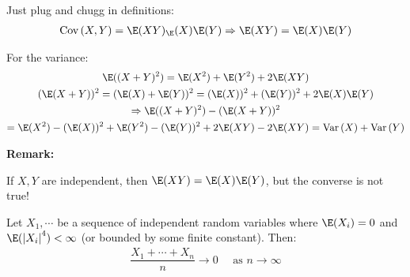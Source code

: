 \begin{prf}[]{}
  Just plug and chugg in definitions:
  \begin{equation*}
    \begin{gathered}
      \text{Cov}\left(X,Y\right) = \E(XY)_\E(X)\E(Y) \Rightarrow \E(XY) = \E(X)\E(Y)
    \end{gathered}
  \end{equation*}\par
  \noindent For the variance:
  \begin{equation*}
    \begin{gathered}
      \E((X+Y)^2) = \E(X^2)+\E(Y^2)+2\E(XY)\\
      (\E(X+Y))^2 = (\E(X)+\E(Y))^2 = (\E(X))^2+(\E(Y))^2 + 2\E(X)\E(Y)\\
      \Rightarrow \E((X+Y)^2)-(\E(X+Y))^2\\
      = \E(X^2)-(\E(X))^2+\E(Y^2)-(\E(Y))^2+2\E(XY)-2\E(XY) = \text{Var}\left(X\right)+\text{Var}\left(Y\right)
    \end{gathered}
  \end{equation*}
\end{prf}
\par\bigskip
\noindent\textbf{Remark:}\par
\noindent If $X,Y$ are independent, then $\E(XY)= \E(X)\E(Y)$, but the converse is not true!
\par\bigskip
\begin{theo}{}
  Let $X_1,\cdots$ be a sequence of independent random variables where $\E(X_i) = 0$ and $\E(\left|X_i\right|^4)<\infty$ (or bounded by some finite constant). Then:
  \begin{equation*}
    \begin{gathered}
      \dfrac{X_1+\cdots+X_n}{n}\to0\quad\text{ as } n\to\infty
    \end{gathered}
  \end{equation*}
\end{theo}
\par\bigskip
